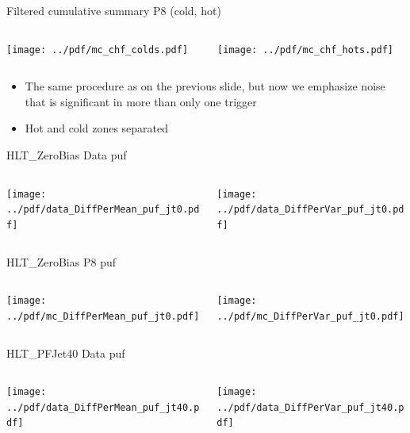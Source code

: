 \documentclass[9pt]{beamer}
\begin{document}
\begin{frame}[t]{Filtered cumulative summary P8 (cold, hot)}
\begin{columns}[T]
  \begin{column}{.5\textwidth}
  \texttt{[image: ../pdf/mc\_chf\_colds.pdf]}
  \end{column}
  \begin{column}{.5\textwidth}
  \texttt{[image: ../pdf/mc\_chf\_hots.pdf]}
  \end{column}
\end{columns}
\begin{itemize}
 \item The same procedure as on the previous slide, but now we emphasize noise that is significant in more than only one trigger
 \item Hot and cold zones separated
\end{itemize}
\end{frame}


\begin{frame}[t]{HLT\_ZeroBias Data puf}
\begin{columns}[T]
  \begin{column}{.5\textwidth}
  \texttt{[image: ../pdf/data\_DiffPerMean\_puf\_jt0.pdf]}
  \end{column}
  \begin{column}{.5\textwidth}
  \texttt{[image: ../pdf/data\_DiffPerVar\_puf\_jt0.pdf]}
  \end{column}
\end{columns}
\end{frame}

\begin{frame}[t]{HLT\_ZeroBias P8 puf}
\begin{columns}[T]
  \begin{column}{.5\textwidth}
  \texttt{[image: ../pdf/mc\_DiffPerMean\_puf\_jt0.pdf]}
  \end{column}
  \begin{column}{.5\textwidth}
  \texttt{[image: ../pdf/mc\_DiffPerVar\_puf\_jt0.pdf]}
  \end{column}
\end{columns}
\end{frame}

\begin{frame}[t]{HLT\_PFJet40 Data puf}
\begin{columns}[T]
  \begin{column}{.5\textwidth}
  \texttt{[image: ../pdf/data\_DiffPerMean\_puf\_jt40.pdf]}
  \end{column}
  \begin{column}{.5\textwidth}
  \texttt{[image: ../pdf/data\_DiffPerVar\_puf\_jt40.pdf]}
  \end{column}
\end{columns}
\end{frame}
\end{document}
